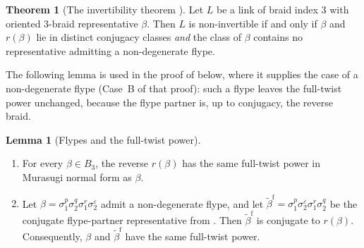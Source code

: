 \documentclass[11pt]{article}
\theoremstyle{definition}
\newtheorem{theorem}{Theorem}[section]
\newtheorem{lemma}[lemma]{Lemma}
\begin{document}
\begin{theorem}[The invertibility theorem {\cite[Theorem~2]{BM2008}}]\label{thm:invert}
Let $L$ be a link of braid index $3$ with oriented $3$-braid representative
$\beta$. Then $L$ is non-invertible if and only if $\beta$ and $r(\beta)$ lie
in distinct conjugacy classes \emph{and} the class of $\beta$ contains no
representative admitting a non-degenerate flype.
\end{theorem}

\noindent The following lemma is used in the proof of 
below, where it supplies the case of a non-degenerate flype (Case~B of that proof):
such a flype leaves the full-twist power unchanged, because the flype partner is, up
to conjugacy, the reverse braid.
\begin{lemma}[Flypes and the full-twist power]\label{lem:flype-twist}
\leavevmode
\begin{enumerate}[label=\textup{(\alph*)}]
\item For every $\beta\in B_3$, the reverse $r(\beta)$ has the same full-twist power in
Murasugi normal form as $\beta$.
\item Let $\beta=\sigma_1^{p}\sigma_2^{q}\sigma_1^{r}\sigma_2^{\varepsilon}$ admit a
non-degenerate flype, and let
$\widetilde\beta^{\mathrm f}=
\sigma_1^{p}\sigma_2^{\varepsilon}\sigma_1^{r}\sigma_2^{q}$ be the conjugate
flype-partner representative from . Then
$\widetilde\beta^{\mathrm f}$ is conjugate to $r(\beta)$. Consequently,
$\beta$ and $\widetilde\beta^{\mathrm f}$ have the same full-twist power.
\end{enumerate}
\end{lemma}
\end{document}
